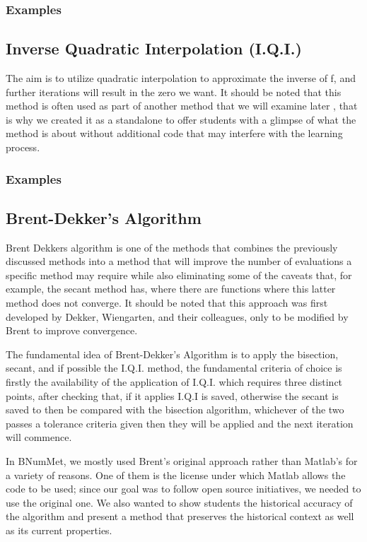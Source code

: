 \subsubsection{Examples}
	

\subsection{Inverse Quadratic Interpolation (I.Q.I.)}
The aim is to utilize quadratic interpolation to approximate the inverse of f, and further iterations will result in the zero we want. It should be noted that this method is often used as part of another method that we will examine later \cite{10.5555/2553197}, that is why we created it as a standalone to offer students with a glimpse of what the method is about without additional code that may interfere with the learning process.

\subsubsection{Examples}
	


\subsection{Brent-Dekker's Algorithm}
Brent Dekkers algorithm is one of the methods that combines the previously discussed methods into a method that will improve the number of evaluations a specific method may require while also eliminating some of the caveats that, for example, the secant method has, where there are functions where this latter method does not converge.  It should be noted that this approach was first developed by Dekker, Wiengarten, and their colleagues, only to be modified by Brent to improve convergence. \cite{brent2002algorithms} 

The fundamental idea of Brent-Dekker's Algorithm is to apply the bisection, secant, and if possible the I.Q.I. method, the fundamental criteria of choice is firstly the availability of the application of I.Q.I. which requires three distinct points, after checking that, if it applies I.Q.I is saved, otherwise the secant is saved to then be compared with the bisection algorithm, whichever of the two passes a tolerance criteria given then they will be applied and the next iteration will commence.


In BNumMet, we mostly used Brent's original approach \cite{Press2007} rather than Matlab's for a variety of reasons. One of them is the license under which Matlab allows the code to be used; since our goal was to follow open source initiatives, we needed to use the original one. We also wanted to show students the historical accuracy of the algorithm and present a method that preserves the historical context as well as its current properties. 

